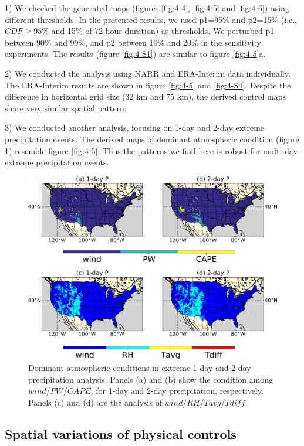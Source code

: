 1) We checked the generated maps (figures \ref{fig:4-4}, \ref{fig:4-5} and \ref{fig:4-6}) using different thresholds. In the presented results, we used p1=95\% and p2=15\% (i.e., $CDF≥95\%$ and 15\% of 72-hour duration) as thresholds. We perturbed p1 between 90\% and 99\%, and p2 between 10\% and 20\% in the sensitivity experiments. The results (figure \ref{fig:4-S1}) are similar to figure \ref{fig:4-5}a.

2) We conducted the analysis using NARR and ERA-Interim data individually. The ERA-Interim results are shown in figure \ref{fig:4-5} and \ref{fig:4-S4}. Despite the difference in horizontal grid size (32 km and 75 km), the derived control maps share very similar spatial pattern.

3) We conducted another analysis, focusing on 1-day and 2-day extreme precipitation events. The derived maps of dominant atmospheric condition (figure \ref{fig:4-8}) resemble figure \ref{fig:4-5}. Thus the patterns we find here is robust for multi-day extreme precipitation events.

\begin{figure}[htbp]
	\includegraphics[width=\linewidth]{pics/ch4/fig8.png}
	\caption{Dominant atmospheric conditions in extreme 1-day and 2-day precipitation analysis. Panels (a) and (b) show the condition among $wind$/$PW$/$CAPE$, for 1-day and 2-day precipitation, respectively. Panels (c) and (d) are the analysis of $wind$/$RH$/$Tavg$/$Tdiff$.}
	\label{fig:4-8}
\end{figure}

\subsection{Spatial variations of physical controls}

